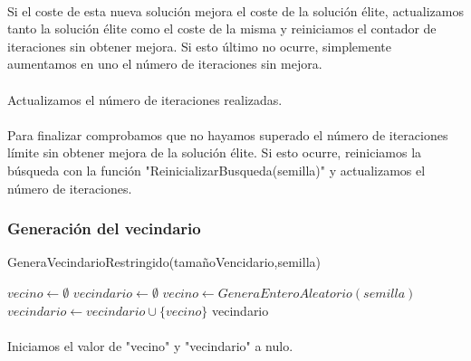 \documentclass{article}
\begin{document}
	\paragraph{}Si el coste de esta nueva solución mejora el coste de la solución élite, actualizamos tanto la solución élite como el coste de la misma y reiniciamos el contador de iteraciones sin obtener mejora. Si esto último no ocurre, simplemente aumentamos en uno el número de iteraciones sin mejora.
	
	\paragraph{}Actualizamos el número de iteraciones realizadas.
	
	\paragraph{}Para finalizar comprobamos que no hayamos superado el número de iteraciones límite sin obtener mejora de la solución élite. Si esto ocurre, reiniciamos la búsqueda con la función "ReinicializarBusqueda(semilla)" y actualizamos el número de iteraciones.
	
	\paragraph{}
	
	
	\subsubsection{Generación del vecindario}
	
	\begin{algorithm}[H]
		\caption{GeneraVecindarioRestringido(tamañoVencidario,semilla)}
		\begin{algorithmic}
			\STATE $vecino \leftarrow \emptyset$
			\STATE $vecindario \leftarrow \emptyset$	
			\STATE $vecino \leftarrow GeneraEnteroAleatorio(semilla)$
			\STATE $vecindario \leftarrow vecindario \cup \{vecino\}$
			\ENDIF
			\ENDWHILE
			\RETURN vecindario
		\end{algorithmic}
	\end{algorithm}
	
	\paragraph{}Iniciamos el valor de "vecino" y "vecindario" a nulo.
	
\end{document}
